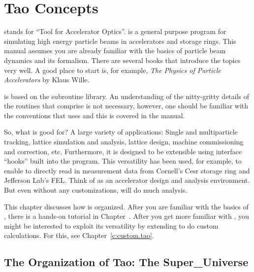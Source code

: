 \chapter{Tao Concepts}
\label{c:concepts}

\tao stands for ``Tool for Accelerator Optics''. \tao is a general
purpose program for simulating high energy particle beams in
accelerators and storage rings. This manual assumes you are already
familiar with the basics of particle beam dynamics and its
formalism. There are several books that introduce the topics very
well. A good place to start is, for example, \textit{The Physics of Particle
Accelerators} by Klaus Wille\cite{b:wille}.

\tao is based on the \bmad\cite{b:bmad} subroutine library. An
understanding of the nitty-gritty details of the routines that
comprise \bmad is not necessary, however, one should be familiar with
the conventions that \bmad uses and this is covered in the \bmad
manual.

So, what is \tao good for? A large variety of applications: Single and
multiparticle tracking, lattice simulation and analysis, lattice
design, machine commissioning and correction, etc. Furthermore, it is
designed to be extensible using interface ``hooks'' built into the
program.  This versatility has been used, for example, to enable \tao
to directly read in measurement data from Cornell's Cesr storage ring
and Jefferson Lab's FEL. Think of \tao as an accelerator design and
analysis environment. But even without any customizations, \tao will
do much analysis.

This chapter discusses how \tao is organized. After you are familiar
with the basics of \tao, there is a hands-on tutorial in
Chapter~. After you get more familiar with \tao, you
might be interested to exploit its versatility by extending \tao to do
custom calculations. For this, see Chapter~\ref{c:custom.tao}.

\section{The Organization of Tao: The Super\_Universe}
\label{s:organization}


